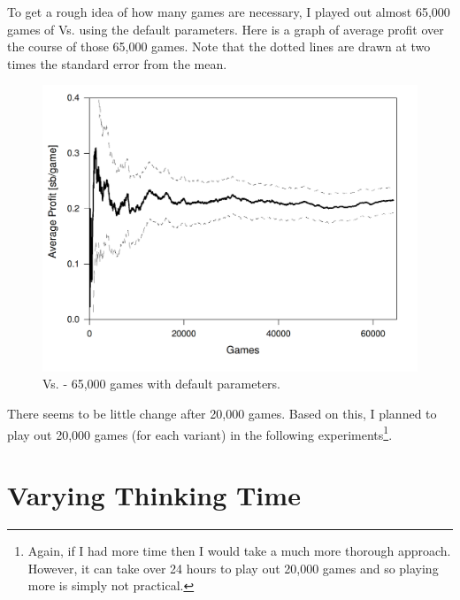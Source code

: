 To get a rough idea of how many games are necessary, I played out almost 65,000 games of \sbt Vs. \mbt using the default parameters. Here is a graph of \mbts average profit over the course of those 65,000 games. Note that the dotted lines are drawn at two times the standard error from the mean. 
\begin{figure}[H]
\centering
\includegraphics[width=144mm]{Graphs/SBvMB-600-65k-v2.png}
\caption{\mbt Vs. \sbt{} - 65,000 games with default parameters.}
\end{figure}


There seems to be little change after 20,000 games. Based on this, I planned to play out 20,000 games (for each variant) in the following experiments\footnote{Again, if I had more time then I would take a much more thorough approach. However, it can take over 24 hours to play out 20,000 games and so playing more is simply not practical.}.



\section{Varying Thinking Time}					%

